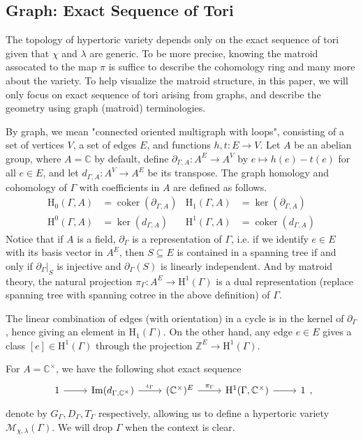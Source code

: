 \documentclass[b5paper]{article}
\newcommand{\ZZ}{\mathbb{Z}}
\newcommand{\MM}{\mathcal{M}}
\newcommand{\HH}{\mathrm{H}}
\newcommand{\coker}{\operatorname{coker}}
\renewcommand{\im}{\operatorname{Im}}
\begin{document}
\subsection{Graph: Exact Sequence of Tori}

The topology of hypertoric variety depends only on the exact sequence of tori given that $\chi$ and $\lambda$ are generic. To be more precise, knowing the matroid assocated to the map $\pi$ is suffice to describe the cohomology ring and many more about the variety. To help visualize the matroid structure, in this paper, we will only focus on exact sequence of tori arising from graphs, and describe the geometry using graph (matroid) terminologies. 

By graph, we mean "connected oriented multigraph with loops", consisting of a set of vertices $V$, a set of edges $E$, and functions $h,t:E\rightarrow V$.
Let $A$ be an abelian group, where $A=\mathbb{C}$ by default, define $ \partial_{\Gamma, A} : A^E \to A^V $ by $ e \mapsto h(e) - t(e) $ for all $ e \in E $, and let $ d_{\Gamma, A} : A^V \to A^E $ be its transpose.
The graph homology and cohomology of $\Gamma$ with coefficients in $A$ are defined as follows.
\begin{align*}
  \HH_0(\Gamma, A) &= \coker(\partial_{\Gamma, A}) & \HH_1(\Gamma, A) &= \ker(\partial_{\Gamma, A}) \\
  \HH^0(\Gamma, A) &= \ker(d_{\Gamma, A}) & \HH^1(\Gamma, A) &= \coker(d_{\Gamma, A})
\end{align*}
Notice that if $A$ is a field, $\partial_\Gamma$ is a representation of $\Gamma$, i.e. if we identify $e\in E$ with its basis vector in $A^E$, then $S\subseteq E$ is contained in a spanning tree if and only if $\partial_\Gamma|_{S}$ is injective and $\partial_\Gamma(S)$ is linearly independent. And by matroid theory, the natural projection $\pi_{\Gamma}:A^E\rightarrow \HH^1(\Gamma)$ is a dual representation (replace spanning tree with spanning cotree in the above definition) of $\Gamma$.

The linear combination of edges (with orientation) in a cycle is in the kernel of $\partial_\Gamma$, hence giving an element in $\HH_1(\Gamma)$. On the other hand, any edge $e \in E$ gives a class $ [e] \in \HH^1(\Gamma) $ through the projection $ \ZZ^E \to \HH^1(\Gamma) $. 

For $A=\mathbb{C}^\times $, we have the following shot exact sequence
\begin{equation}
  \label{eq:exact_sequence_tori_graph}
    \begin{tikzcd}
        1 \arrow[r] & \im(d_{\Gamma, \mathbb{C}^\times}) \arrow[r, "\iota_\Gamma"] & (\mathbb{C}^\times)^E \arrow[r, "\pi_\Gamma"] & \HH^1(\Gamma, \mathbb{C}^\times) \arrow[r] & 1
    \end{tikzcd},
\end{equation}
denote by $G_\Gamma,D_\Gamma,T_\Gamma$ respectively, allowing us to define a hypertoric variety $\MM_{\chi,\lambda}(\Gamma)$. We will drop $\Gamma$ when the context is clear. 
\end{document}
